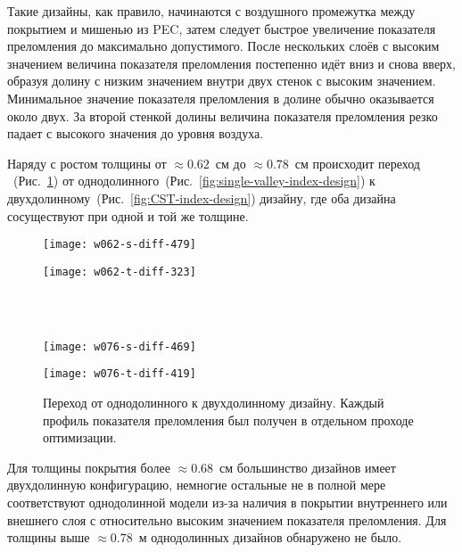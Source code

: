 Такие дизайны, как правило, начинаются с воздушного промежутка между
покрытием и мишенью из PEC, затем следует быстрое увеличение
показателя преломления до максимально допустимого. После нескольких
слоёв с высоким значением величина показателя преломления постепенно
идёт вниз и снова вверх, образуя долину с низким значением внутри двух
стенок с высоким значением. Минимальное значение показателя
преломления в долине обычно оказывается около двух. За второй стенкой
долины величина показателя преломления резко падает с высокого значения до
уровня воздуха.

Наряду с ростом толщины от ${\approx 0.62}$~см до ${\approx 0.78}$~см
происходит переход ~(Рис.~\ref{fig:transition}) от
однодолинного~(Рис.~\ref{fig:single-valley-index-design}) к
двухдолинному~(Рис.~\ref{fig:CST-index-design}) дизайну, где оба
дизайна сосуществуют при одной и той же толщине.

\begin{figure}
  \begin{minipage}[h]{0.45\textwidth}
    \texttt{[image: w062-s-diff-479]}
  \end{minipage}
  \hfill
  \begin{minipage}[h]{0.45\textwidth}
    \texttt{[image: w062-t-diff-323]}
  \end{minipage}\\
  \vspace{12pt}\\
  \begin{minipage}[h]{0.45\textwidth}
    \texttt{[image: w076-s-diff-469]}
  \end{minipage}
  \hfill
  \begin{minipage}[h]{0.45\textwidth}
    \texttt{[image: w076-t-diff-419]}
  \end{minipage}%
  \caption{Переход от однодолинного к двухдолинному дизайну. Каждый
    профиль показателя преломления был получен в отдельном проходе оптимизации.
    \label{fig:transition}}%
\end{figure}
Для толщины покрытия более ${\approx 0.68}$~см большинство дизайнов
имеет двухдолинную конфигурацию, немногие остальные не в полной мере
соответствуют однодолинной модели из-за наличия в покрытии внутреннего или
внешнего слоя с относительно высоким значением показателя
преломления. Для толщины выше ${\approx 0.78}$~м однодолинных дизайнов
обнаружено не было.

